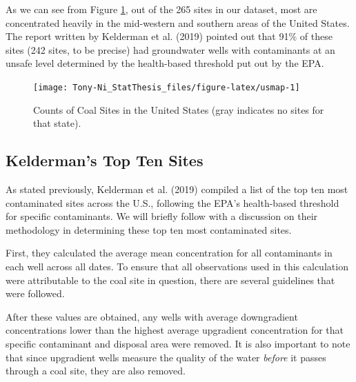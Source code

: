 \documentclass[12pt, twoside]{amherstthesis}
\begin{document}
As we can see from Figure \ref{fig:usmap}, out of the 265 sites in our dataset, most are concentrated heavily in the mid-western and southern areas of the United States. The report written by Kelderman et al. (2019) pointed out that 91\% of these sites (242 sites, to be precise) had groundwater wells with contaminants at an unsafe level determined by the health-based threshold put out by the EPA.
\begin{figure}

{\centering \texttt{[image: Tony-Ni\_StatThesis\_files/figure-latex/usmap-1]} 

}

\caption{Counts of Coal Sites in the United States (gray indicates no sites for that state).}\label{fig:usmap}
\end{figure}
\hypertarget{keldermans-top-ten-sites}{%
\subsection{Kelderman's Top Ten Sites}\label{keldermans-top-ten-sites}}

As stated previously, Kelderman et al. (2019) compiled a list of the top ten most contaminated sites across the U.S., following the EPA's health-based threshold for specific contaminants. We will briefly follow with a discussion on their methodology in determining these top ten most contaminated sites.

First, they calculated the average mean concentration for all contaminants in each well across all dates. To ensure that all observations used in this calculation were attributable to the coal site in question, there are several guidelines that were followed.

After these values are obtained, any wells with average downgradient concentrations lower than the highest average upgradient concentration for that specific contaminant and disposal area were removed. It is also important to note that since upgradient wells measure the quality of the water \emph{before} it passes through a coal site, they are also removed.
\end{document}
